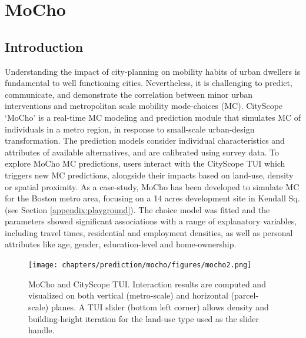 \section{MoCho}\label{sec:cityscope-mocho}
{
    \subsection{Introduction}
    {
        Understanding the impact of city-planning on mobility habits of urban dwellers is fundamental to well functioning cities. Nevertheless, it is challenging to predict, communicate, and demonstrate the correlation between minor urban interventions and metropolitan scale mobility mode-choices (MC). CityScope `MoCho' is a real-time MC modeling and prediction module that simulates MC of individuals in a metro region, in response to small-scale urban-design transformation. The prediction models consider individual characteristics and attributes of available alternatives, and are calibrated using survey data. To explore MoCho MC predictions, users interact with the CityScope TUI which triggers new MC predictions, alongside their impacts based on land-use, density or spatial proximity. As a case-study, MoCho has been developed to simulate MC for the Boston metro area, focusing on a 14 acres development site in Kendall Sq. (see Section \eqref{appendix:playground}). The choice model was fitted and the parameters showed significant associations with a range of explanatory variables, including travel times, residential and employment densities, as well as personal attributes like age, gender, education-level and home-ownership.
    }



    \begin{figure}[!htb]
        \centering
        \texttt{[image: chapters/prediction/mocho/figures/mocho2.png]}
        \caption{
            MoCho and CityScope TUI. Interaction results are computed and visualized on both vertical (metro-scale) and horizontal (parcel-scale) planes. A TUI slider (bottom left corner) allows density and building-height iteration for the land-use type used as the slider handle.
        }
        \label{fig:mocho_tui}
    \end{figure}

}
